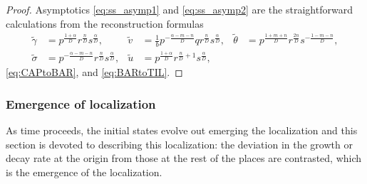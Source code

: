 \documentclass[a4paper,11pt]{article}
\def\tg{{\tilde{\gamma}}}
\def\tv{{\tilde{v}}}
\def\tth{{\tilde{\theta}}}
\def\ts{{\tilde{\sigma}}}
\def\tu{{\tilde{u}}}
\theoremstyle{remark}
\begin{document}
\begin{proof}
Asymptotics \eqref{eq:ss_asymp1} and \eqref{eq:ss_asymp2} are the straightforward calculations from the reconstruction formulas
\begin{align*}
 \tg&=p^{\frac{1+\alpha}{D}}r^{\frac{n}{D}}s^{\frac{\alpha}{D}}, & \tv &= \frac{1}{b} p^{-\frac{\alpha-m-n}{D}}qr^{\frac{n}{D}}s^{\frac{\alpha}{D}}, & \tth&=p^{\frac{1+m+n}{D}}r^{\frac{2n}{D}}s^{-\frac{1-m-n}{D}}, \\ \ts&=p^{-\frac{\alpha-m-n}{D}}r^{\frac{n}{D}}s^{\frac{\alpha}{D}},  & \tu&=p^{\frac{1+\alpha}{D}}r^{\frac{n}{D}+1}s^{\frac{\alpha}{D}},
\end{align*}
\eqref{eq:CAPtoBAR}, and \eqref{eq:BARtoTIL}.
%
%
%
\end{proof}

\subsubsection{Emergence of localization}
As time proceeds, the initial states evolve out emerging the localization and this section is devoted to describing this localization: the deviation in the growth or decay rate at the origin from those at the rest of the places are contrasted, which is the emergence of the localization.
\end{document}
